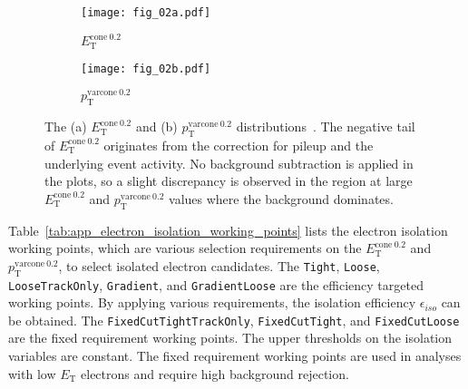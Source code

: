 \begin{figure}[htbp]
    \begin{subfigure}[b]{0.48\textwidth}
        \begin{center}
            \texttt{[image: fig\_02a.pdf]}
            \caption{$E_\mathrm{T}^\mathrm{cone\ 0.2}$}
        \end{center}
    \end{subfigure}
    \begin{subfigure}[b]{0.48\textwidth}
        \begin{center}
            \texttt{[image: fig\_02b.pdf]}
            \caption{$p_\mathrm{T}^\mathrm{varcone\ 0.2}$}
        \end{center}
    \end{subfigure}
    \caption{The (a) $E_\mathrm{T}^\mathrm{cone\ 0.2}$ and (b) $p_\mathrm{T}^\mathrm{varcone\ 0.2}$ distributions~\cite{ATLAS:2016iqc}.
    The negative tail of $E_\mathrm{T}^\mathrm{cone\ 0.2}$ originates from the correction for pileup and the underlying event activity.
    No background subtraction is applied in the plots, so a slight discrepancy is observed in the region at large $E_\mathrm{T}^\mathrm{cone\ 0.2}$ and $p_\mathrm{T}^\mathrm{varcone\ 0.2}$ values where the background dominates.}
    \label{fig:app_electron_isolation_ETcone20_PTvarcone20}
\end{figure}

Table~\ref{tab:app_electron_isolation_working_points} lists the electron isolation working points, which are various selection requirements on the $E_\mathrm{T}^\mathrm{cone\ 0.2}$ and $p_\mathrm{T}^\mathrm{varcone\ 0.2}$, to select isolated electron candidates.
The \texttt{Tight}, \texttt{Loose}, \texttt{LooseTrackOnly}, \texttt{Gradient}, and \texttt{GradientLoose} are the efficiency targeted working points.
By applying various requirements, the isolation efficiency $\epsilon_{iso}$ can be obtained.
The \texttt{FixedCutTightTrackOnly}, \texttt{FixedCutTight}, and \texttt{FixedCutLoose} are the fixed requirement working points.
The upper thresholds on the isolation variables are constant.
The fixed requirement working points are used in analyses with low $E_\mathrm{T}$ electrons and require high background rejection.

